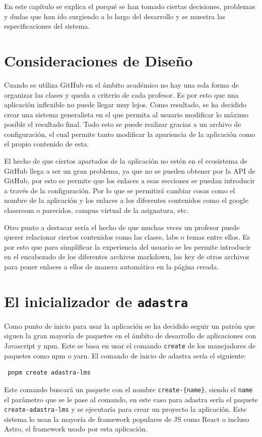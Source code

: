 En este capítulo se explica el porqué se han tomado ciertas decisiones, problemas y dudas que han ido surgiendo a lo largo del desarrollo y se muestra las especificaciones del sistema.

\section{Consideraciones de Diseño}
Cuando se utiliza GitHub en el ámbito académico no hay una sola forma de organizar las clases y queda a criterio de cada profesor. Es por esto que una aplicación inflexible no puede llegar muy lejos. Como resultado, se ha decidido crear una sistema generalista en el que permita al usuario modificar lo máximo posible el resultado final. Todo esto se puede realizar gracias a un archivo de configuración, el cual permite tanto modificar la apariencia de la aplicación como el propio contenido de esta.

El hecho de que ciertos apartados de la aplicación no estén en el ecosistema de GitHub llega a ser un gran problema, ya que no se pueden obtener por la API de GitHub, por esto se permite que los enlaces a esas secciones se puedan introducir a través de la configuración. Por lo que se permitirá cambiar cosas como el nombre de la aplicación y los enlaces a los diferentes contenidos como el google classroom o parecidos, campus virtual de la asignatura, etc.

Otro punto a destacar sería el hecho de que muchas veces un profesor puede querer relacionar ciertos contenidos como las clases, labs o temas entre ellos. Es por esto que para simplificar la experiencia del usuario se les permite introducir en el encabezado de los diferentes archivos markdown, las key de otros archivos para poner enlaces a ellos de manera automática en la página creada.

\section{El inicializador de {\tt adastra}}
Como punto de inicio para usar la aplicación se ha decidido seguir un patrón que siguen la gran mayoría de paquetes en el ámbito de desarrollo de aplicaciones con Javascript y npm. Este se basa en usar el comando \verb|create| de los manejadores de paquetes como npm o yarn. El comando de inicio de adastra sería el siguiente:

\begin{verbatim} pnpm create adastra-lms\end{verbatim}
Este comando buscará un paquete con el nombre \verb|create-{name}|, siendo el \verb|name| el parámetro que se le pase al comando, en este caso para adastra sería el paquete \verb|create-adastra-lms| y se ejecutaría para crear un proyecto la aplicación. Este sistema lo usan la mayoría de framework populares de JS como React o incluso Astro, el framework usado por esta aplicación.

